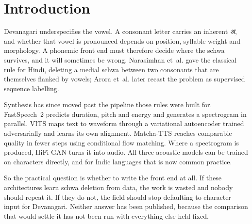 \documentclass[runningheads]{llncs}
\newcommand{\dev}[1]{\textit{#1}}
\newcommand{\dev}[1]{{\devfont #1}}
\begin{document}
\begin{abstract}
Second, I document three measurement defects, each of which produced a
plausible answer that was wrong, and give the diagnostic that exposes each:
a training objective whose dominant terms are mean squared errors in physical
units, so its loss is not comparable across data scales even on nested
subsets; punctuated references that make a site-partitioned error rate
partition partly on the punctuation; and an unseeded sampling decoder, which
made two runs of one command disagree about the sign of the headline
contrast.

\end{abstract}

\section{Introduction}

Devanagari underspecifies the vowel. A consonant letter carries an inherent
\dev{अ}, and whether that vowel is pronounced depends on position, syllable
weight and morphology. A phonemic front end must therefore decide where the
schwa survives, and it will sometimes be wrong. Narasimhan et~al.
\cite{narasimhan2004schwa} gave the classical rule for Hindi, deleting a
medial schwa between two consonants that are themselves flanked by vowels;
Arora et~al. \cite{arora2020schwa} later recast the problem as supervised
sequence labelling.

Synthesis has since moved past the pipeline those rules were built for.
FastSpeech~2 \cite{ren2021fastspeech2} predicts duration, pitch and energy and
generates a spectrogram in parallel. VITS \cite{kim2021vits} maps text to
waveform through a variational autoencoder trained adversarially and learns
its own alignment. Matcha-TTS \cite{mehta2024matcha} reaches comparable
quality in fewer steps using conditional flow matching. Where a spectrogram is
produced, HiFi-GAN \cite{kong2020hifigan} turns it into audio. All three
acoustic models can be trained on characters directly, and for Indic languages
that is now common practice.

So the practical question is whether to write the front end at all. If these
architectures learn schwa deletion from data, the work is wasted and nobody
should repeat it. If they do not, the field should stop defaulting to
character input for Devanagari. Neither answer has been published, because the
comparison that would settle it has not been run with everything else held
fixed.
\end{document}
